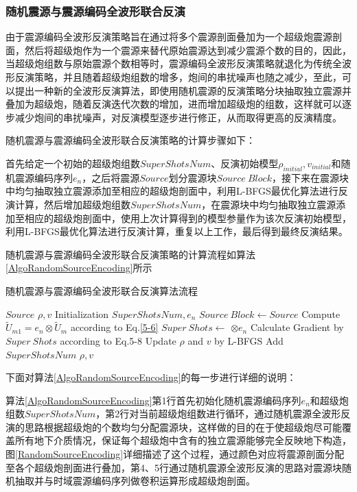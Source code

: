 \documentclass[12pt]{article}
\renewcommand{\algorithmicrequire}{\textbf{参数说明:}}
\renewcommand{\algorithmicensure}{\textbf{输出:}}
\begin{document}
\subsubsection{随机震源与震源编码全波形联合反演}
由于震源编码全波形反演策略旨在通过将多个震源剖面叠加为一个超级炮震源剖面，然后将超级炮作为一个震源来替代原始震源达到减少震源个数的目的，因此，当超级炮组数与原始震源个数相等时，震源编码全波形反演策略就退化为传统全波形反演策略，并且随着超级炮组数的增多，炮间的串扰噪声也随之减少，至此，可以提出一种新的全波形反演算法，即使用随机震源的反演策略分块抽取独立震源并叠加为超级炮，随着反演迭代次数的增加，进而增加超级炮的组数，这样就可以逐步减少炮间的串扰噪声，对反演模型逐步进行修正，从而取得更高的反演精度。
\par
随机震源与震源编码全波形联合反演策略的计算步骤如下：
\par
首先给定一个初始的超级炮组数$SuperShotsNum$、反演初始模型$\rho_{initial},v_{initial}$和随机震源编码序列$e_n$，之后将震源$Source$划分震源块$Source\ Block$，接下来在震源块中均匀抽取独立震源添加至相应的超级炮剖面中，利用L-BFGS最优化算法进行反演计算，然后增加超级炮组数$SuperShotsNum$，在震源块中均匀抽取独立震源添加至相应的超级炮剖面中，使用上次计算得到的模型参量作为该次反演初始模型，利用L-BFGS最优化算法进行反演计算，重复以上工作，最后得到最终反演结果。
\par
随机震源与震源编码全波形联合反演策略的计算流程如算法\ref{AlgoRandomSourceEncoding}所示
\begin{algorithm}[H]
\caption{随机震源与震源编码全波形联合反演算法流程}
\label{AlgoRandomSourceEncoding}
\renewcommand{\algorithmicrequire}{\textbf{输入:}}
\renewcommand{\algorithmicensure}{\textbf{输出:}}
\begin{algorithmic}[1]
\Require
$Source$
\Ensure
$\rho,v$
\State Initialization $SuperShotsNum,e_n$
\State $Source\ Block \gets Source$
\State Compute $\tilde{U}_{m1}=e_n \otimes \tilde{U}_m$ according to Eq.\ref{5-6}
\State $Super\ Shots \gets$  $\otimes e_n$
\State Calculate Gradient by $Super\ Shots$ according to Eq.5-8
\State Update $\rho$ and $v$ by L-BFGS
\EndFor
\State Add $SuperShotsNum$
\EndFor
\State \Return $\rho,v$
\end{algorithmic}
\end{algorithm}
\par
下面对算法\ref{AlgoRandomSourceEncoding}的每一步进行详细的说明：
\par
算法\ref{AlgoRandomSourceEncoding}第1行首先初始化随机震源编码序列$e_n$和超级炮组数$SuperShotsNum$，第2行对当前超级炮组数进行循环，通过随机震源全波形反演的思路根据超级炮的个数均匀分配震源块，这样做的目的在于使超级炮尽可能覆盖所有地下介质情况，保证每个超级炮中含有的独立震源能够完全反映地下构造，图\ref{RandomSourceEncoding}详细描述了这个过程，通过颜色对应将震源剖面分配至各个超级炮剖面进行叠加，第4、5行通过随机震源全波形反演的思路对震源块随机抽取并与时域震源编码序列做卷积运算形成超级炮剖面。
\end{document}
